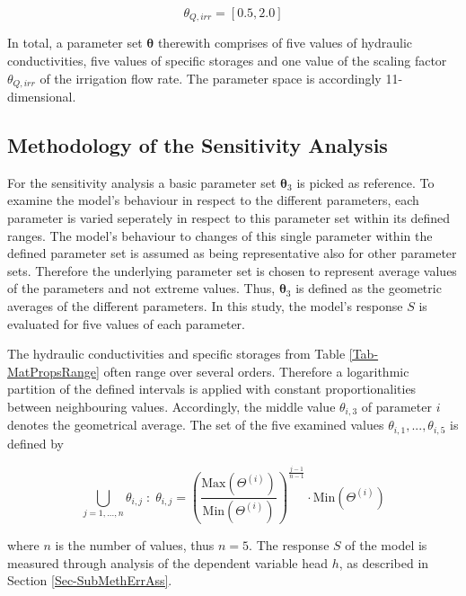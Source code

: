 \begin{equation}
    \theta_{Q,irr} = \left[ 0.5, 2.0 \right]
\end{equation}

In total, a parameter set $\bm{\theta}$ therewith comprises of five values of hydraulic conductivities, five values of specific storages and one value of the scaling factor $\theta_{Q,irr}$ of the irrigation flow rate. 
The parameter space is accordingly 11-dimensional.


\subsection{Methodology of the Sensitivity Analysis}
\label{Sec-SubMethSAna}

For the sensitivity analysis a basic parameter set $\bm{\theta}_3$ is picked as reference. 
To examine the model's behaviour in respect to the different parameters, each parameter is varied seperately in respect to this parameter set within its defined ranges. 
The model's behaviour to changes of this single parameter within the defined parameter set is assumed as being representative also for other parameter sets. 
Therefore the underlying parameter set is chosen to represent average values of the parameters and not extreme values. 
Thus, $\bm{\theta}_3$ is defined as the geometric averages of the different parameters. 
In this study, the model's response $S$ is evaluated for five values of each parameter. 
    
The hydraulic conductivities and specific storages from Table \ref{Tab-MatPropsRange} often range over several orders. 
Therefore a logarithmic partition of the defined intervals is applied with constant proportionalities between neighbouring values. 
Accordingly, the middle value $\theta_{i,3}$ of parameter $i$ denotes the geometrical average. 
The set of the five examined values $\theta_{i,1},...,\theta_{i,5}$ is defined by

\begin{equation}
    \label{Eq-ParamValCalc}
    \bigcup_{j=1,...,n} \theta_{i,j} \; : \; \theta_{i,j} = \left( \frac{\textrm{Max}(\Theta^{(i)})}{\textrm{Min}(\Theta^{(i)})} \right) ^{\frac{j-1}{n-1}} \cdot \textrm{Min}(\Theta^{(i)})
\end{equation}

\noindent where $n$ is the number of values, thus $n=5$. 
The response $S$ of the model is measured through analysis of the dependent variable head $h$, as described in Section \ref{Sec-SubMethErrAss}.

